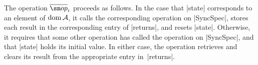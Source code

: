 The operation $\overline\op_i$ proceeds as follows.  In the case that |state|
corresponds to an element of $\mathop{\rm dom} \mathcal{A}$, it calls the corresponding operation
on |SyncSpec|, stores each result in the corresponding entry of |returns|, and
resets |state|.  Otherwise, it requires that some other operation has called
the operation on |SyncSpec|, and that |state| holds its initial value.  In
either case, the operation retrieves and clears its result from the
appropriate entry in~|returns|.







